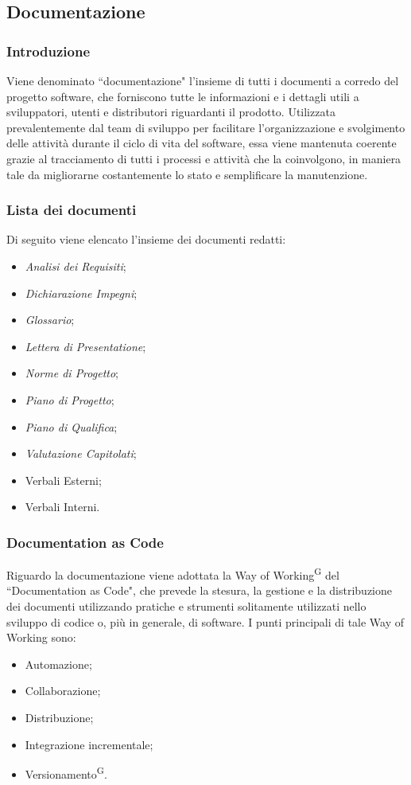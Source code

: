 \documentclass[8pt]{article}
\newcommand{\glossterm}[1]{#1\textsuperscript{G}} %
\begin{document}
\subsection{Documentazione} \label{sec:doc}
\subsubsection{Introduzione}
Viene denominato ``documentazione" l'insieme di tutti i documenti a corredo del progetto software,
che forniscono tutte le informazioni e i dettagli utili a sviluppatori, utenti e distributori
riguardanti il prodotto. Utilizzata prevalentemente dal team di sviluppo per facilitare
l'organizzazione e svolgimento delle attività  durante il ciclo di vita del software, essa viene
mantenuta coerente grazie al tracciamento di tutti i processi e attività che la coinvolgono, in maniera tale da migliorarne costantemente lo stato e semplificare la manutenzione.
\subsubsection{Lista dei documenti}
Di seguito viene elencato l'insieme dei documenti redatti:
\begin{itemize}
    \item \textit{Analisi dei Requisiti};
    \item \textit{Dichiarazione Impegni};
    \item \textit{Glossario};
    \item \textit{Lettera di Presentatione};
    \item \textit{Norme di Progetto};
    \item \textit{Piano di Progetto};
    \item \textit{Piano di Qualifica};
    \item \textit{Valutazione Capitolati};
    \item Verbali Esterni;
    \item Verbali Interni.
\end{itemize}

\subsubsection{Documentation as Code}
Riguardo la documentazione viene adottata la \glossterm{Way of Working} del ``Documentation as
Code", che prevede la stesura, la gestione e la distribuzione dei documenti utilizzando pratiche e strumenti solitamente utilizzati nello sviluppo di codice o, più in generale, di software. I punti principali di tale Way of Working sono:
\begin{itemize}
    \item Automazione;
    \item Collaborazione;
    \item Distribuzione;
    \item Integrazione incrementale;
    \item \glossterm{Versionamento}.
\end{itemize}
\end{document}
